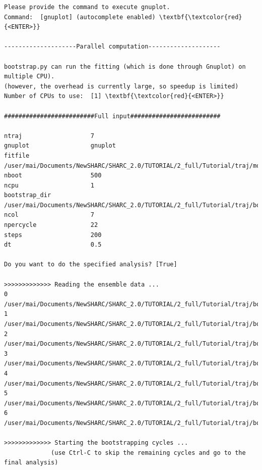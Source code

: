 \documentclass[a4paper,11pt,DIV=15,openany]{scrbook}
\begin{document}
\begin{oframed}
\begin{Verbatim}[commandchars=\\\{\}]
Please provide the command to execute gnuplot.
Command:  [gnuplot] (autocomplete enabled) \textbf{\textcolor{red}{<ENTER>}}

--------------------Parallel computation--------------------

bootstrap.py can run the fitting (which is done through Gnuplot) on multiple CPU).
(however, the overhead is currently large, so speedup is limited)
Number of CPUs to use:  [1] \textbf{\textcolor{red}{<ENTER>}}

#########################Full input#########################

ntraj                   7
gnuplot                 gnuplot
fitfile                 /user/mai/Documents/NewSHARC/SHARC_2.0/TUTORIAL/2_full/Tutorial/traj/model_fit.gp
nboot                   500
ncpu                    1
bootstrap_dir           /user/mai/Documents/NewSHARC/SHARC_2.0/TUTORIAL/2_full/Tutorial/traj/bootstrap_data
ncol                    7
npercycle               22
steps                   200
dt                      0.5

Do you want to do the specified analysis? [True] 

>>>>>>>>>>>>> Reading the ensemble data ...
0 /user/mai/Documents/NewSHARC/SHARC_2.0/TUTORIAL/2_full/Tutorial/traj/bootstrap_data/pop_1.dat
1 /user/mai/Documents/NewSHARC/SHARC_2.0/TUTORIAL/2_full/Tutorial/traj/bootstrap_data/pop_2.dat
2 /user/mai/Documents/NewSHARC/SHARC_2.0/TUTORIAL/2_full/Tutorial/traj/bootstrap_data/pop_3.dat
3 /user/mai/Documents/NewSHARC/SHARC_2.0/TUTORIAL/2_full/Tutorial/traj/bootstrap_data/pop_4.dat
4 /user/mai/Documents/NewSHARC/SHARC_2.0/TUTORIAL/2_full/Tutorial/traj/bootstrap_data/pop_5.dat
5 /user/mai/Documents/NewSHARC/SHARC_2.0/TUTORIAL/2_full/Tutorial/traj/bootstrap_data/pop_6.dat
6 /user/mai/Documents/NewSHARC/SHARC_2.0/TUTORIAL/2_full/Tutorial/traj/bootstrap_data/pop_7.dat

>>>>>>>>>>>>> Starting the bootstrapping cycles ...
             (use Ctrl-C to skip the remaining cycles and go to the final analysis)


\end{Verbatim}
\end{oframed}
\end{document}

